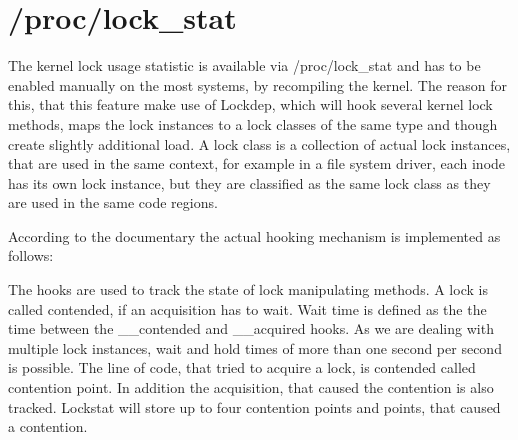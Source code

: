 \section{/proc/lock\_stat}

The kernel lock usage statistic is available via /proc/lock\_stat 
and has to be enabled manually on the most systems, by recompiling the kernel.
The reason for this, that this feature make use of Lockdep, which will
hook several kernel lock methods, maps the lock instances to a lock classes of the same type
and though create slightly additional load.
A lock class is a collection of actual lock instances, that are used in the same context,
for example in a file system driver, each inode has its own lock instance,
but they are classified as the same lock class as they are used in the same code regions.

According to the documentary the actual hooking mechanism is implemented as follows:

\begin{center}
\end{center}

The hooks are used to track the state of lock manipulating methods.
A lock is called contended, if an acquisition has to wait.
Wait time is defined as the the time between the \_\_contended and \_\_acquired hooks.
As we are dealing with multiple lock instances, wait and hold times of more
than one second per second is possible.
The line of code, that tried to acquire a lock, is contended called contention point.
In addition the acquisition, that caused the contention is also tracked.
Lockstat will store up to four contention points and points, that caused a contention.


